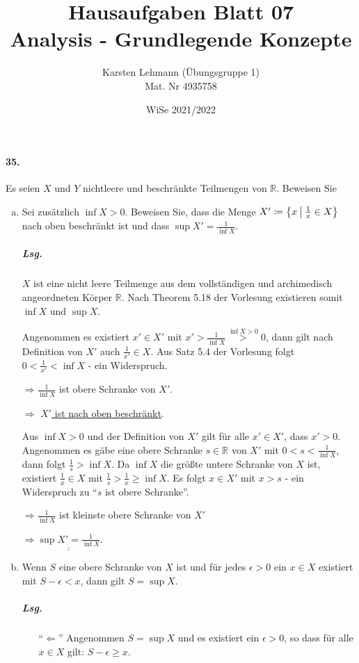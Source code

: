 \documentclass{scrreprt}
\author{Karsten Lehmann (Übungsgruppe 1)\\Mat. Nr 4935758}
\date{WiSe 2021/2022}
\title{Hausaufgaben Blatt 07\\Analysis - Grundlegende Konzepte}
\begin{document}
\paragraph{35.} Es seien $X$ und $Y$ nichtleere und beschränkte Teilmengen von
$\mathbb{R}$.
Beweisen Sie
\begin{enumerate}[(a)]
\item Sei zusätzlich $\inf X > 0$.
  Beweisen Sie, dass die Menge
  $X' \coloneqq \qty\big{x \: {\big |} \: \frac{1}{x} \in X}$
  nach oben beschränkt ist und dass
  $\sup X' = \frac{1}{\inf X}$.

  \subparagraph{Lsg.} $X$ ist eine nicht leere Teilmenge aus dem vollständigen
  und archimedisch angeordneten Körper $\mathbb{R}$.
  Nach Theorem 5.18 der Vorlesung existieren somit $\inf X$ und $\sup X$.

  Angenommen es existiert $x' \in X'$ mit
  $x' > \frac{1}{\inf X} \overset{\inf X > 0}> 0$, dann gilt nach Definition
  von $X'$ auch $\frac{1}{x'} \in X$.
  Aus Satz 5.4 der Vorlesung folgt $0 < \frac{1}{x'} < \inf X$ - ein Widerspruch.

  $\Rightarrow \frac{1}{\inf X}$ ist obere Schranke von $X'$.

  $\Rightarrow$ \underline{\underline{$X'$ ist nach oben beschränkt}}.

  Aus $\inf X > 0$ und der Definition von $X'$ gilt für alle
  $x' \in X'$, dass $x' > 0$.
  Angenommen es gäbe eine obere Schranke $s \in \mathbb{R}$ von $X'$ mit
  $0 < s < \frac{1}{\inf X}$, dann folgt $\frac{1}{s} > \inf X$.
  Da $\inf X$ die größte untere Schranke von $X$ ist, existiert
  $\frac{1}{x} \in X$ mit $\frac{1}{s} > \frac{1}{x} \geq \inf X$.
  Es folgt $x \in X'$ mit $x > s$ - ein Widerspruch zu
  ``$s$ ist obere Schranke''.

  $\Rightarrow \frac{1}{\inf X}$ ist kleinste obere Schranke von $X'$

  $\Rightarrow \underline{\underline{\sup X' = \frac{1}{\inf X}}}$.

\item \label{sec:35_b}
  Wenn $S$ eine obere Schranke von $X$ ist und für jedes $\epsilon > 0$
  ein $x \in X$ existiert mit $S - \epsilon < x$, dann gilt $S = \sup X$.

  \subparagraph{Lsg.}
  \begin{itemize}
  \item[``$\Leftarrow$''] Angenommen $S = \sup X$ und es existiert ein
    $\epsilon > 0$, so dass für alle $x \in X$ gilt: $S - \epsilon \geq x$.


\end{itemize}
\end{enumerate}
\end{document}
